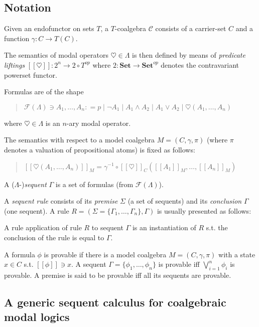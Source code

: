 \documentclass{llncs}
\newcommand{\hearts}{\heartsuit}
\newcommand{\sem}[1]{[\![#1]\!]}
\begin{document}
\subsection{Notation}

Given an endofunctor on sets $T$, a $T$-coalgebra $\mathcal{C}$ consists of a
carrier-set $C$ and a function $\gamma:C\rightarrow T(C)$.

The semantics of modal operators $\hearts\in\Lambda$ is then defined by means
of \emph{predicate liftings} $\sem{\hearts}:2^n\rightarrow2\circ T^{op}$ where
$2:\mathbf{Set}\rightarrow\mathbf{Set}^{op}$ denotes the contravariant powerset functor.

Formulas are of the shape
\begin{quote}
$\mathcal{F}(\Lambda)\ni A_1,\ldots,A_n\mathrel{\mathop:}=p\mid \neg A_1 \mid A_1\wedge A_2\mid A_1\vee A_2 \mid \hearts(A_1,\ldots,A_n)$
\end{quote}
where $\hearts\in\Lambda$ is an $n$-ary modal operator.

The semantics with respect to a model coalgebra $M=(C,\gamma,\pi)$ (where $\pi$ denotes a
valuation of propositional atoms) is fixed as follows:
\begin{quote}
$\sem{\hearts(A_1,\ldots,A_n)}_M=\gamma^{-1}\circ\sem{\hearts}_C(\sem{A_1}_M,\ldots,\sem{A_n}_M)$
\end{quote}

A ($\Lambda$-)\emph{sequent} $\Gamma$ is a set of formulas (from $\mathcal{F}(\Lambda)$).

A \emph{sequent rule} consists of its \emph{premise} $\Sigma$ (a set of sequents)
and its \emph{conclusion} $\Gamma$ (one sequent). A rule $R=(\Sigma=\{\Gamma_1,\ldots,\Gamma_n\},\Gamma)$ 
is usually presented as follows:
\begin{quote}
\centerline{}
\end{quote}

A rule application of rule $R$ to sequent $\Gamma$ is an instantiation of $R$
s.t. the conclusion of the rule is equal to $\Gamma$.

A formula $\phi$ is provable if there is a model coalgebra $M=(C,\gamma,\pi)$ with a
state $x\in C$ s.t. $\sem{\phi}\ni x$. A sequent $\Gamma=\{\phi_1,\ldots,\phi_n\}$ is provable
iff $\bigvee_{i=1}^n\phi_i$ is provable.
A premise is said to be provable iff all its sequents are provable.

\subsection{A generic sequent calculus for coalgebraic modal logics}
\end{document}
